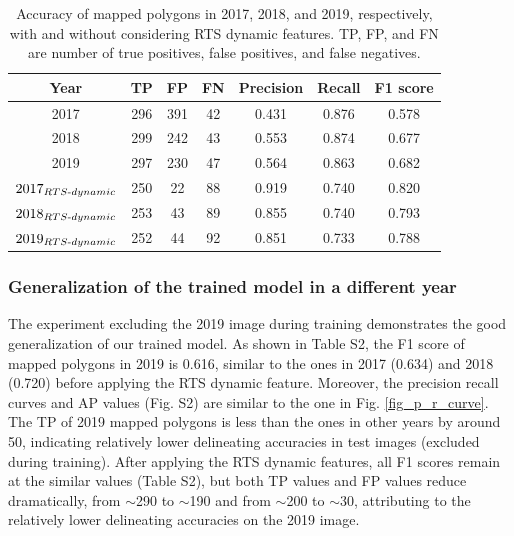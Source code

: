 \documentclass[authoryear,preprint,review,12pt]{elsarticle}
\begin{document}
\begin{table}[ht]
\footnotesize
  \centering
  \caption{Accuracy of mapped polygons in 2017, 2018, and 2019, respectively, with and without considering RTS dynamic features. TP, FP, and FN are number of true positives, false positives, and false negatives.}
    \begin{tabular}{c c c c c c c}
\toprule
    \textbf{Year} & \textbf{TP} & \textbf{FP} & \textbf{FN} & \textbf{Precision} & \textbf{Recall} & \textbf{F1 score} \\
\midrule
   2017 & 296   & 391   & 42    & 0.431 & 0.876 & 0.578 \\
   2018 & 299   & 242   & 43    & 0.553 & 0.874 & 0.677 \\
   2019 & 297   & 230   & 47    & 0.564 & 0.863 & 0.682 \\
   $2017_{RTS{\text -}dynamic}$ & 250   & 22    & 88    & 0.919 & 0.740 & 0.820 \\
   $2018_{RTS{\text -}dynamic}$ & 253   & 43    & 89    & 0.855 & 0.740 & 0.793 \\
   $2019_{RTS{\text -}dynamic}$ & 252   & 44    & 92    & 0.851 & 0.733 & 0.788 \\

\bottomrule
    \end{tabular}
  \label{table_accuracy_f1}
\end{table}

\subsubsection{Generalization of the trained model in a different year}
\label{sec_generalization}

The experiment excluding the 2019 image during training demonstrates the good generalization of our trained model. 
As shown in Table S2, the F1 score of mapped polygons in 2019 is 0.616, similar to the ones in 2017  (0.634) and 2018 (0.720) before applying the RTS dynamic feature.
Moreover, the precision recall curves and AP values (Fig. S2) are similar to the one in Fig. \ref{fig_p_r_curve}.
The TP of 2019 mapped polygons is less than the ones in other years by around 50, indicating relatively lower delineating accuracies in test images (excluded during training). 
After applying the RTS dynamic features, all F1 scores remain at the similar values (Table S2), but both TP values and FP values reduce dramatically, from $\sim$290 to $\sim$190 and from $\sim$200 to $\sim$30, attributing to the relatively lower delineating accuracies on the 2019 image.
\end{document}
